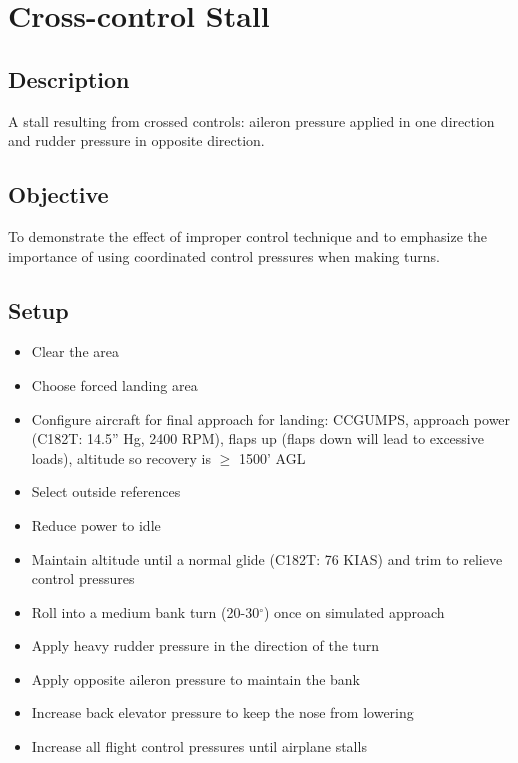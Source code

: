 \section{Cross-control Stall}

\subsection{Description}

A stall resulting from crossed controls: aileron pressure applied in one
direction and rudder pressure in opposite direction.

\subsection{Objective}

To demonstrate the effect of improper control technique and to emphasize the
importance of using coordinated control pressures when making turns.

\subsection{Setup}

\begin{itemize}
  \item Clear the area
  \item Choose forced landing area
  \item Configure aircraft for final approach for landing: CCGUMPS, approach
    power (C182T: 14.5'' Hg, 2400 RPM), flaps up (flaps down will lead to
    excessive loads), altitude so recovery is $\geq$ 1500' AGL
  \item Select outside references
  \item Reduce power to idle
  \item Maintain altitude until a normal glide (C182T: 76 KIAS) and trim to
    relieve control pressures
  \item Roll into a medium bank turn (20-30$^\circ$) once on simulated approach
  \item Apply heavy rudder pressure in the direction of the turn
  \item Apply opposite aileron pressure to maintain the bank
  \item Increase back elevator pressure to keep the nose from lowering
  \item Increase all flight control pressures until airplane stalls
\end{itemize}

